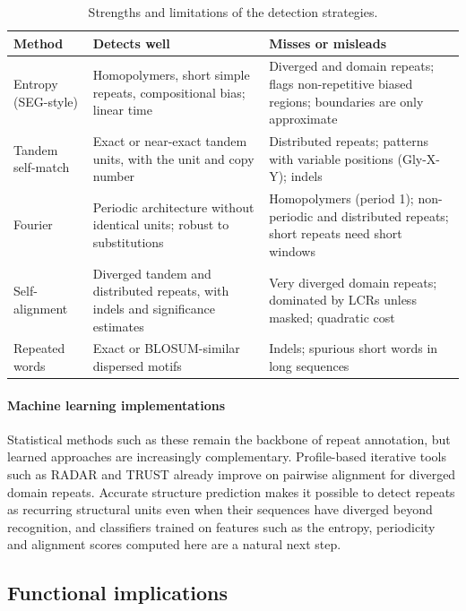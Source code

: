 \documentclass[11pt,a4paper]{article}
\begin{document}
\begin{table}[tbp]
\centering
\caption{Strengths and limitations of the detection strategies.}
\label{tab:compare}
\small
\begin{tabularx}{\linewidth}{@{}l>{\raggedright\arraybackslash}X>{\raggedright\arraybackslash}X@{}}
\toprule
Method & Detects well & Misses or misleads \\
\midrule
Entropy (SEG-style) & Homopolymers, short simple repeats, compositional bias; linear time
  & Diverged and domain repeats; flags non-repetitive biased regions; boundaries are only approximate \\
Tandem self-match & Exact or near-exact tandem units, with the unit and copy number
  & Distributed repeats; patterns with variable positions (Gly-X-Y); indels \\
Fourier & Periodic architecture without identical units; robust to substitutions
  & Homopolymers (period 1); non-periodic and distributed repeats; short repeats need short windows \\
Self-alignment & Diverged tandem and distributed repeats, with indels and significance estimates
  & Very diverged domain repeats; dominated by LCRs unless masked; quadratic cost \\
Repeated words & Exact or BLOSUM-similar dispersed motifs
  & Indels; spurious short words in long sequences \\
\bottomrule
\end{tabularx}
\end{table}

\paragraph{Machine learning implementations} Statistical methods such as these remain the backbone of repeat
annotation, but learned approaches are increasingly complementary. Profile-based iterative tools
such as RADAR \cite{heger2000radar} and TRUST \cite{szklarczyk2004trust} already improve on pairwise alignment for
diverged domain repeats. Accurate structure prediction \cite{jumper2021alphafold} makes it possible to detect
repeats as recurring structural units even when their sequences have diverged beyond recognition, and
classifiers trained on features such as the entropy, periodicity and alignment scores computed here are a
natural next step.

\subsection{Functional implications}\label{sec:implications}
\end{document}
